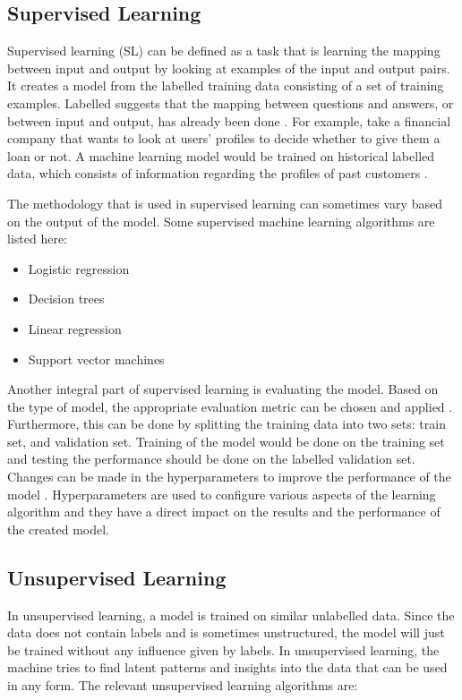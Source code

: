 \subsection{Supervised Learning}

Supervised learning (SL) can be defined as a task that is learning the mapping between input and output by looking at examples of the input and output pairs. It creates a model from the labelled training data consisting of a set of training examples. Labelled suggests that the mapping between questions and answers, or between input and output, has already been done \cite{singh2019natural}. For example, take a financial company that wants to look at users’ profiles to decide whether to give them a loan or not. A machine learning model would be trained on historical labelled data, which consists of information regarding the profiles of past customers \cite{kotsiantis2007supervised}. 

The methodology that is used in supervised learning can sometimes vary based on the output of the model. Some supervised machine learning algorithms are listed here:

\begin{itemize}
  \item Logistic regression
  \item Decision trees
  \item Linear regression
  \item Support vector machines
\end{itemize}

Another integral part of supervised learning is evaluating the model. Based on the type of model, the appropriate evaluation metric can be chosen and applied \cite{sebastiani2002machine}. Furthermore, this can be done by splitting the training data into two sets: train set, and validation set. Training of the model would be done on the training set and testing the performance should be done on the labelled validation set. Changes can be made in the hyperparameters to improve the performance of the model \cite{kotsiantis2007supervised}. Hyperparameters are used to configure various aspects of the learning algorithm and they  have a direct impact on the results and the performance of the created model.

\subsection{Unsupervised Learning}

In unsupervised learning, a model is trained on similar unlabelled data. Since the data does not contain labels and is sometimes unstructured, the model will just be trained without any influence given by labels. In unsupervised learning, the machine tries to find latent patterns and insights into the data that can be used in any form. The relevant unsupervised learning algorithms are:


